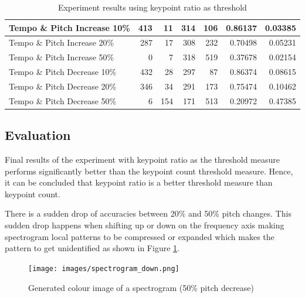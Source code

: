 \begin{table}[H]
\begin{tabular}{|L|r|r|r|r|r|r|}
        Tempo  \& Pitch Increase 10\%      & 413         & 11          & 314         & 106         & 0.86137           & 0.03385          \\ \hline
        Tempo  \& Pitch Increase 20\% & 287         & 17          & 308         & 232         & 0.70498           & 0.05231          \\ \hline
        Tempo  \& Pitch Increase 50\% & 0           & 7           & 318         & 519         & 0.37678           & 0.02154          \\ \hline
        Tempo  \& Pitch Decrease 10\% & 432         & 28          & 297         & 87          & 0.86374           & 0.08615          \\ \hline
        Tempo  \& Pitch Decrease 20\% & 346         & 34          & 291         & 173         & 0.75474           & 0.10462          \\ \hline
        Tempo  \& Pitch Decrease 50\% & 6           & 154         & 171         & 513         & 0.20972           & 0.47385          \\ \hline
    \end{tabular}
    \vspace{12pt}
\caption{Experiment results using keypoint ratio as threshold}
\label{tab:test_results_keypoint_ratio}
\end{table}


\subsection{Evaluation}

Final results of the experiment with keypoint ratio as the threshold measure performs significantly better
than the keypoint count threshold measure. Hence, it can be concluded that keypoint ratio is a better
threshold measure than keypoint count.
\vspace{12pt}

There is a sudden drop of accuracies between 20\% and 50\% pitch changes. This sudden drop happens when shifting
up or down on the frequency axis making spectrogram local patterns to be compressed or expanded which makes the pattern
to get unidentified as shown in Figure \ref{fig:spectrogram_down}.


\begin{figure}[h]
    \centering
    \texttt{[image: images/spectrogram\_down.png]}
    \caption{Generated colour image of a spectrogram (50\% pitch decrease)}
    \label{fig:spectrogram_down}
  \end{figure}
